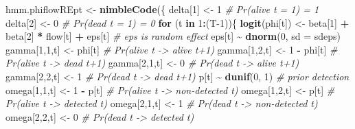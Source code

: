 \documentclass[
  12pt,
]{krantz}
\newenvironment{Shaded}{\begin{snugshade}}{\end{snugshade}}
\newcommand{\AttributeTok}[1]{\textcolor[rgb]{0.13,0.29,0.53}{#1}}
\newcommand{\CommentTok}[1]{\textcolor[rgb]{0.56,0.35,0.01}{\textit{#1}}}
\newcommand{\ControlFlowTok}[1]{\textcolor[rgb]{0.13,0.29,0.53}{\textbf{#1}}}
\newcommand{\DecValTok}[1]{\textcolor[rgb]{0.00,0.00,0.81}{#1}}
\newcommand{\FunctionTok}[1]{\textcolor[rgb]{0.13,0.29,0.53}{\textbf{#1}}}
\newcommand{\NormalTok}[1]{#1}
\newcommand{\OtherTok}[1]{\textcolor[rgb]{0.56,0.35,0.01}{#1}}
\newcommand{\SpecialCharTok}[1]{\textcolor[rgb]{0.81,0.36,0.00}{\textbf{#1}}}
\begin{document}
\begin{Shaded}
\begin{Highlighting}[]
\NormalTok{hmm.phiflowREpt }\OtherTok{\textless{}{-}} \FunctionTok{nimbleCode}\NormalTok{(\{}
\NormalTok{  delta[}\DecValTok{1}\NormalTok{] }\OtherTok{\textless{}{-}} \DecValTok{1}          \CommentTok{\# Pr(alive t = 1) = 1}
\NormalTok{  delta[}\DecValTok{2}\NormalTok{] }\OtherTok{\textless{}{-}} \DecValTok{0}          \CommentTok{\# Pr(dead t = 1) = 0}
  \ControlFlowTok{for}\NormalTok{ (t }\ControlFlowTok{in} \DecValTok{1}\SpecialCharTok{:}\NormalTok{(T}\DecValTok{{-}1}\NormalTok{))\{}
    \FunctionTok{logit}\NormalTok{(phi[t]) }\OtherTok{\textless{}{-}}\NormalTok{ beta[}\DecValTok{1}\NormalTok{] }\SpecialCharTok{+}\NormalTok{ beta[}\DecValTok{2}\NormalTok{] }\SpecialCharTok{*}\NormalTok{ flow[t] }\SpecialCharTok{+}\NormalTok{ eps[t] }\CommentTok{\# eps is random effect}
\NormalTok{    eps[t] }\SpecialCharTok{\textasciitilde{}} \FunctionTok{dnorm}\NormalTok{(}\DecValTok{0}\NormalTok{, }\AttributeTok{sd =}\NormalTok{ sdeps) }
\NormalTok{    gamma[}\DecValTok{1}\NormalTok{,}\DecValTok{1}\NormalTok{,t] }\OtherTok{\textless{}{-}}\NormalTok{ phi[t]      }\CommentTok{\# Pr(alive t {-}\textgreater{} alive t+1)}
\NormalTok{    gamma[}\DecValTok{1}\NormalTok{,}\DecValTok{2}\NormalTok{,t] }\OtherTok{\textless{}{-}} \DecValTok{1} \SpecialCharTok{{-}}\NormalTok{ phi[t]  }\CommentTok{\# Pr(alive t {-}\textgreater{} dead t+1)}
\NormalTok{    gamma[}\DecValTok{2}\NormalTok{,}\DecValTok{1}\NormalTok{,t] }\OtherTok{\textless{}{-}} \DecValTok{0}           \CommentTok{\# Pr(dead t {-}\textgreater{} alive t+1)}
\NormalTok{    gamma[}\DecValTok{2}\NormalTok{,}\DecValTok{2}\NormalTok{,t] }\OtherTok{\textless{}{-}} \DecValTok{1}           \CommentTok{\# Pr(dead t {-}\textgreater{} dead t+1)}
\NormalTok{    p[t] }\SpecialCharTok{\textasciitilde{}} \FunctionTok{dunif}\NormalTok{(}\DecValTok{0}\NormalTok{, }\DecValTok{1}\NormalTok{)          }\CommentTok{\# prior detection}
\NormalTok{    omega[}\DecValTok{1}\NormalTok{,}\DecValTok{1}\NormalTok{,t] }\OtherTok{\textless{}{-}} \DecValTok{1} \SpecialCharTok{{-}}\NormalTok{ p[t]    }\CommentTok{\# Pr(alive t {-}\textgreater{} non{-}detected t)}
\NormalTok{    omega[}\DecValTok{1}\NormalTok{,}\DecValTok{2}\NormalTok{,t] }\OtherTok{\textless{}{-}}\NormalTok{ p[t]        }\CommentTok{\# Pr(alive t {-}\textgreater{} detected t)}
\NormalTok{    omega[}\DecValTok{2}\NormalTok{,}\DecValTok{1}\NormalTok{,t] }\OtherTok{\textless{}{-}} \DecValTok{1}           \CommentTok{\# Pr(dead t {-}\textgreater{} non{-}detected t)}
\NormalTok{    omega[}\DecValTok{2}\NormalTok{,}\DecValTok{2}\NormalTok{,t] }\OtherTok{\textless{}{-}} \DecValTok{0}           \CommentTok{\# Pr(dead t {-}\textgreater{} detected t)}

\end{Highlighting}
\end{Shaded}
\end{document}
